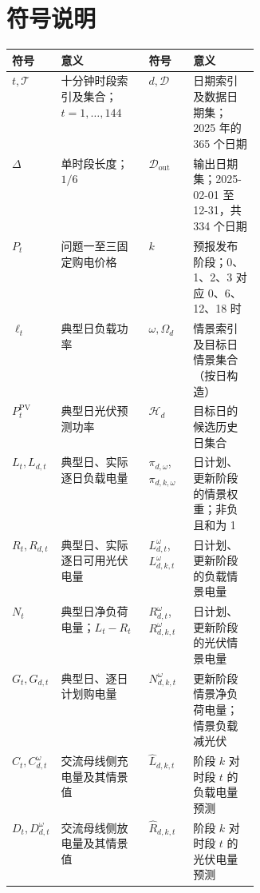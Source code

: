 \section{符号说明}
\label{sec:symbols}

\begingroup
\centering
\linespread{1}\selectfont
\fontsize{10.5pt}{13.5pt}\selectfont
\setlength{\tabcolsep}{4pt}
\renewcommand{\arraystretch}{1.15}
\renewcommand{\tabularxcolumn}[1]{m{#1}}
\noindent
\begin{tabularx}{\linewidth}{@{}
  >{\centering\arraybackslash}m{0.18\linewidth}
  >{\centering\arraybackslash}X|
  >{\centering\arraybackslash}m{0.18\linewidth}
  >{\centering\arraybackslash}X@{}}
\toprule[0.8pt]
符号 & 意义 & 符号 & 意义 \\
\midrule[0.5pt]
$t,\mathcal T$ & 十分钟时段索引及集合；$t=1,\ldots,144$ & $d,\mathcal D$ & 日期索引及数据日期集；2025 年的 365 个日期 \\
$\Delta$ & 单时段长度；$1/6$ & $\mathcal D_{\mathrm{out}}$ & 输出日期集；2025-02-01 至 12-31，共 334 个日期 \\
$P_t$ & 问题一至三固定购电价格 & $k$ & 预报发布阶段；0、1、2、3 对应 0、6、12、18 时 \\
$\ell_t$ & 典型日负载功率 & $\omega,\Omega_d$ & 情景索引及目标日情景集合（按日构造） \\
$P_t^{\mathrm{PV}}$ & 典型日光伏预测功率 & $\mathcal H_d$ & 目标日的候选历史日集合 \\
$L_t,L_{d,t}$ & 典型日、实际逐日负载电量 & $\pi_{d,\omega}$,\newline $\pi_{d,k,\omega}$ & 日计划、更新阶段的情景权重；非负且和为 1 \\
$R_t,R_{d,t}$ & 典型日、实际逐日可用光伏电量 & $L^\omega_{d,t}$,\newline $L^\omega_{d,k,t}$ & 日计划、更新阶段的负载情景电量 \\
$N_t$ & 典型日净负荷电量；$L_t-R_t$ & $R^\omega_{d,t}$,\newline $R^\omega_{d,k,t}$ & 日计划、更新阶段的光伏情景电量 \\
$G_t,G_{d,t}$ & 典型日、逐日计划购电量 & $N^\omega_{d,k,t}$ & 更新阶段情景净负荷电量；情景负载减光伏 \\
$C_t,C^\omega_{d,t}$ & 交流母线侧充电量及其情景值 & $\widehat L_{d,k,t}$ & 阶段 $k$ 对时段 $t$ 的负载电量预测 \\
$D_t,D^\omega_{d,t}$ & 交流母线侧放电量及其情景值 & $\widehat R_{d,k,t}$ & 阶段 $k$ 对时段 $t$ 的光伏电量预测 \\

\end{tabularx}
